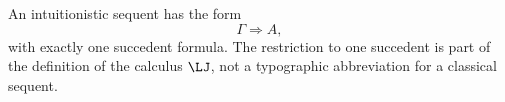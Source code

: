 \begin{definition}
An intuitionistic sequent has the form
\[
  \Gamma\Rightarrow A,
\]
with exactly one succedent formula.  The restriction to one succedent is part
of the definition of the calculus \(\LJ\), not a typographic abbreviation for
a classical sequent.
\end{definition}

